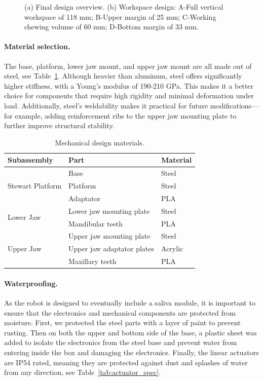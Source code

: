 \begin{figure}[H]
\begin{minipage}{.4\textwidth}
  \subcaption{}
  \label{fig:vertical_workspace}
\end{minipage}
\caption{(a) Final design overview. (b) Workspace design: A-Full vertical workspace of 118 mm; B-Upper margin of 25 mm; C-Working chewing volume of 60 mm; D-Bottom margin of 33 mm.}
\label{fig:mecha_design}
\end{figure}

\paragraph{Material selection.}The base, platform, lower jaw mount, and upper jaw mount are all made out of steel, see Table~\ref{tab:mecha_materials}. 
Although heavier than aluminum, steel offers significantly higher stiffness, with a Young's modulus of 190-210 GPa. This makes it a better choice 
for components that require high rigidity and minimal deformation under load. Additionally, steel's weldability makes it practical for future 
modifications—for example, adding reinforcement ribs to the upper jaw mounting plate to further improve structural stability.

\begin{table}[H]
\centering
\begin{tabular}{@{}p{3.5cm} p{4.6cm} p{3cm}@{}}
\toprule
\textbf{Subassembly} & \textbf{Part} & \textbf{Material} \\
\midrule
\multirow{3}{*}{Stewart Platform} 
    & Base & Steel \\
    & Platform & Steel \\
    & Adaptator & PLA \\
\midrule
\multirow{2}{*}{Lower Jaw} 
    & Lower jaw mounting plate & Steel \\
    & Mandibular teeth & PLA \\
\midrule
\multirow{3}{*}{Upper Jaw} 
    & Upper jaw mounting plate & Steel \\
    & Upper jaw adaptator plates & Acrylic \\
    & Maxillary teeth & PLA \\
\bottomrule
\end{tabular}
\caption{Mechanical design materials.}
\label{tab:mecha_materials}
\end{table}

\paragraph{Waterproofing.}
As the robot is designed to eventually include a saliva module, it is important to ensure that the electronics and mechanical components are protected from moisture.
First, we protected the steel parts with a layer of paint to prevent rusting. Then on both the upper and bottom side of the base, a plastic sheet was added 
to isolate the electronics from the steel base and prevent water from entering inside the box and damaging the electronics. 
Finally, the linear actuators are IP54 rated, meaning they are protected against dust and splashes of water from any direction, see Table~\ref{tab:actuator_spec}.

